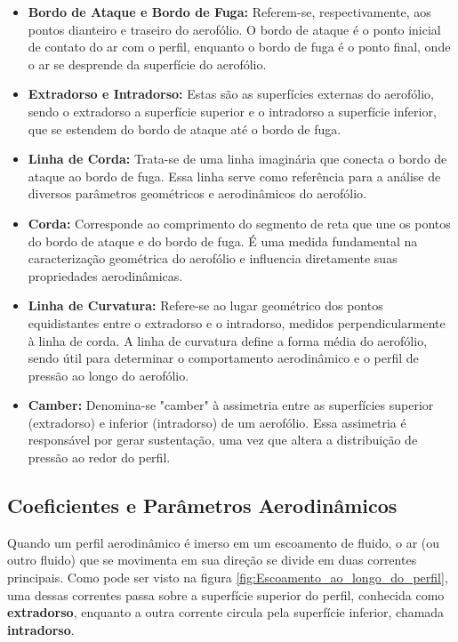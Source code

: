         \begin{itemize}  
            \item \textbf{Bordo de Ataque e Bordo de Fuga:}   
            Referem-se, respectivamente, aos pontos dianteiro e traseiro do aerofólio. O bordo de ataque é o ponto inicial de contato do ar com o perfil, enquanto o bordo de fuga é o ponto final, onde o ar se desprende da superfície do aerofólio.  
            
            \item \textbf{Extradorso e Intradorso:}   
            Estas são as superfícies externas do aerofólio, sendo o extradorso a superfície superior e o intradorso a superfície inferior, que se estendem do bordo de ataque até o bordo de fuga.  
            
            \item \textbf{Linha de Corda:}   
            Trata-se de uma linha imaginária que conecta o bordo de ataque ao bordo de fuga. Essa linha serve como referência para a análise de diversos parâmetros geométricos e aerodinâmicos do aerofólio.  
            
            \item \textbf{Corda:}   
            Corresponde ao comprimento do segmento de reta que une os pontos do bordo de ataque e do bordo de fuga. É uma medida fundamental na caracterização geométrica do aerofólio e influencia diretamente suas propriedades aerodinâmicas.  
            
            \item \textbf{Linha de Curvatura:}   
            Refere-se ao lugar geométrico dos pontos equidistantes entre o extradorso e o intradorso, medidos perpendicularmente à linha de corda. A linha de curvatura define a forma média do aerofólio, sendo útil para determinar o comportamento aerodinâmico e o perfil de pressão ao longo do aerofólio.  
            
            \item \textbf{Camber:}   
            Denomina-se "camber" à assimetria entre as superfícies superior (extradorso) e inferior (intradorso) de um aerofólio. Essa assimetria é responsável por gerar sustentação, uma vez que altera a distribuição de pressão ao redor do perfil.  
        \end{itemize}  
        
    \subsection{Coeficientes e Parâmetros Aerodinâmicos}
        \par Quando um perfil aerodinâmico é imerso em um escoamento de fluido, o ar (ou outro fluido) que se movimenta em sua direção se divide em duas correntes principais. Como pode ser visto na figura \ref{fig:Escoamento_ao_longo_do_perfil}, uma dessas correntes passa sobre a superfície superior do perfil, conhecida como \textbf{extradorso}, enquanto a outra corrente circula pela superfície inferior, chamada \textbf{intradorso}.

